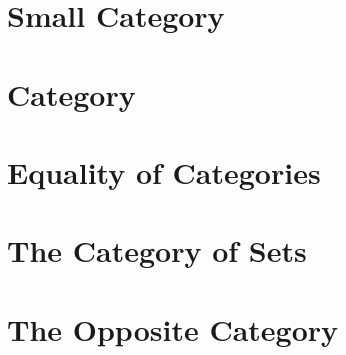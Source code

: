 \section{Small Category}
    
\section{Category}
    
\section{Equality of Categories}
    
\section{The Category of Sets}
    
\section{The Opposite Category}
    
